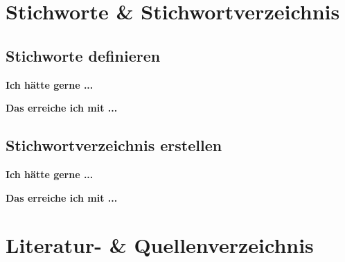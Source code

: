 \documentclass[twoside, 
               a4paper, 
               10pt, 
               parskip=full, 
               sectionentrydots=true, 
               listof=totoc, 
               listof=entryprefix,
               numbers=endperiod]{scrartcl}
\begin{document}
\section{Stichworte \& Stichwortverzeichnis}
\subsection{Stichworte definieren}

{\textbf {Ich hätte gerne ...}}
 
\begin{miniSeite}[colbacktitle=black!35!white,title=Ausdruck]

\end{miniSeite}


\newpage
{\textbf {Das erreiche ich mit ...}}
 
\begin{miniSeite}[colbacktitle=black!35!white,title=\LaTeX-Code]

\end{miniSeite}




\newpage
\subsection{Stichwortverzeichnis erstellen}
{\textbf {Ich hätte gerne ...}}
 
\begin{miniSeite}[colbacktitle=black!35!white,title=Ausdruck]

\end{miniSeite}


\newpage
{\textbf {Das erreiche ich mit ...}}
 
\begin{miniSeite}[colbacktitle=black!35!white,title=\LaTeX-Code]

\end{miniSeite}





\newpage
\section{Literatur- \& Quellenverzeichnis}
\end{document}
